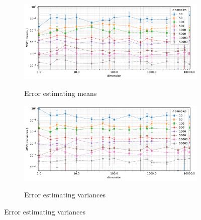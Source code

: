 \begin{figure}[t]
    \centering
    \vspace{-0.5em}
    \begin{subfigure}[b]{0.9\textwidth}
        \centering
        \caption{\small Error estimating means}
        \includegraphics[width=\textwidth]{images/estimation/trend-properties-mse_means(dimension)-n_correlated_0.80-covariance_0.80-samples_10,50,100,500,1000,5000,10000,50000-aggregated.pdf}
        \label{fig:estimation-strong-means}
    \end{subfigure}

    \vspace{-0.5em}
    \begin{subfigure}[b]{0.9\textwidth}
        \centering
        \caption{\small Error estimating variances}
        \includegraphics[width=\textwidth]{images/estimation/trend-properties-mse_vars(dimension)-n_correlated_0.80-covariance_0.80-samples_10,50,100,500,1000,5000,10000,50000-aggregated.pdf}
        \label{fig:estimation-strong-variances}
    \end{subfigure}


\end{figure}
